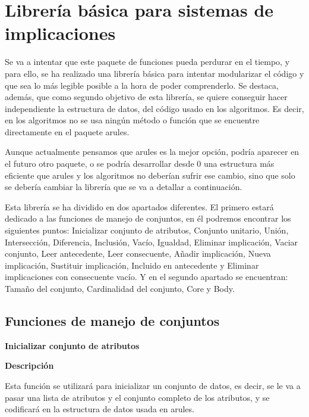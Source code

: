 \section{Librer\'ia b\'asica para sistemas de implicaciones}
Se va a intentar que este paquete de funciones pueda perdurar en el tiempo, y para ello, 
se ha realizado una librer\'ia b\'asica para intentar modularizar el c\'odigo y que sea lo 
m\'as legible posible a la hora de poder comprenderlo. Se destaca, adem\'as, que como segundo 
objetivo de esta librer\'ia, se quiere conseguir hacer independiente la estructura de datos, del c\'odigo usado 
en los algoritmos. Es decir, en los algoritmos no se usa ning\'un m\'etodo o funci\'on que se encuentre directamente 
en el paquete arules. 

Aunque actualmente pensamos que arules es la mejor opci\'on, podr\'ia aparecer en el futuro otro paquete, o se podr\'ia 
desarrollar desde 0 una estructura m\'as eficiente que arules y los algoritmos no deber\'ian sufrir ese cambio, sino que solo 
se deber\'ia cambiar la librer\'ia que se va a detallar a continuaci\'on.

Esta librer\'ia se ha dividido en dos apartados diferentes. El primero estar\'a dedicado a las funciones de manejo de conjuntos, 
en \'el podremos encontrar los siguientes puntos: Inicializar conjunto de atributos, Conjunto unitario, Uni\'on, Intersecci\'on, 
Diferencia, Inclusi\'on, Vac\'io, Igualdad, Eliminar implicaci\'on, Vaciar conjunto, Leer antecedente, Leer consecuente, A\~nadir 
implicaci\'on, Nueva implicaci\'on, Sustituir implicaci\'on, Incluido en antecedente y Eliminar implicaciones con consecuente vac\'io. 
Y en el segundo apartado se encuentran: Tama\~no del conjunto, Cardinalidad del conjunto, Core y Body.

\subsection{Funciones de manejo de conjuntos}

\smallskip

\textbf{ \large Inicializar conjunto de atributos}

    \smallskip

    \textbf{Descripci\'on}

    Esta funci\'on se utilizar\'a para inicializar un conjunto de datos, es decir, se le va a pasar una lista de atributos y el 
    conjunto completo de los atributos, y se codificar\'a en la estructura de datos usada en arules.
    
